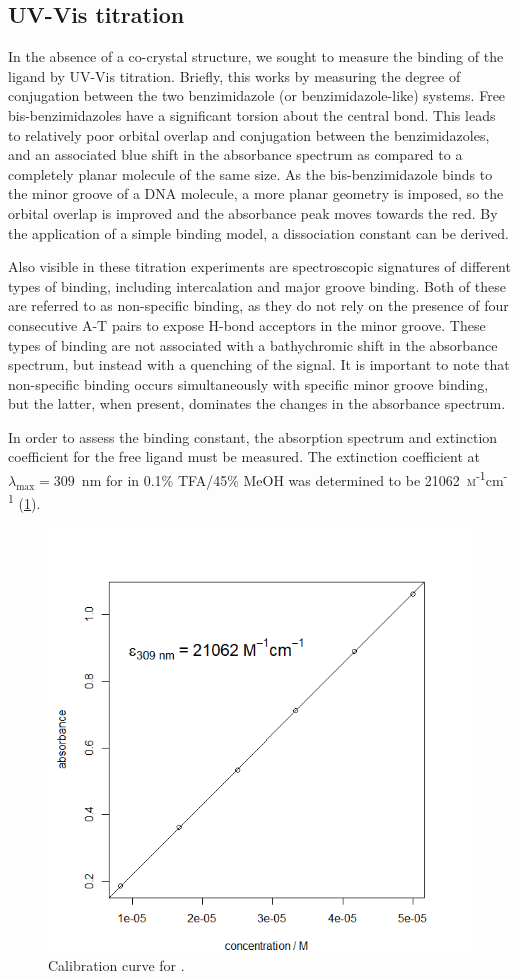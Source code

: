 \begin{refsection}
\subsection{UV-Vis titration}\label{sec:absorbance}
In the absence of a co-crystal structure, we sought to measure the binding of the ligand by UV-Vis titration.
Briefly, this works by measuring the degree of conjugation between the two benzimidazole (or benzimidazole-like) systems.
Free bis-benzimidazoles have a significant torsion about the central bond.
This leads to relatively poor orbital overlap and conjugation between the benzimidazoles, and an associated blue shift in the absorbance spectrum as compared to a completely planar molecule of the same size.
As the bis-benzimidazole binds to the minor groove of a DNA molecule, a more planar geometry is imposed, so the orbital overlap is improved and the absorbance peak moves towards the red.
By the application of a simple binding model, a dissociation constant can be derived.

Also visible in these titration experiments are spectroscopic signatures of different types of binding, including intercalation and major groove binding.
Both of these are referred to as non-specific binding, as they do not rely on the presence of four consecutive A-T pairs to expose H-bond acceptors in the minor groove.
These types of binding are not associated with a bathychromic shift in the absorbance spectrum, but instead with a quenching of the signal.
It is important to note that non-specific binding occurs simultaneously with specific minor groove binding, but the latter, when present, dominates the changes in the absorbance spectrum.

In order to assess the binding constant, the absorption spectrum and extinction coefficient for the free ligand must be measured.
The extinction coefficient at $\lambda_{\text{max}} = 309$~nm for  in 0.1\% TFA/45\% MeOH was determined to be 21062~\textsc{m}\textsuperscript{-1}cm\textsuperscript{-1} (\cref{fig:ebs-rhs-ph-calcurve}).

\begin{figure}
    \includegraphics[width=0.5\linewidth]{Figures/ebshoe-calibration.png}
    \caption{Calibration curve for .}\label{fig:ebs-rhs-ph-calcurve}
\end{figure}


\end{refsection}
